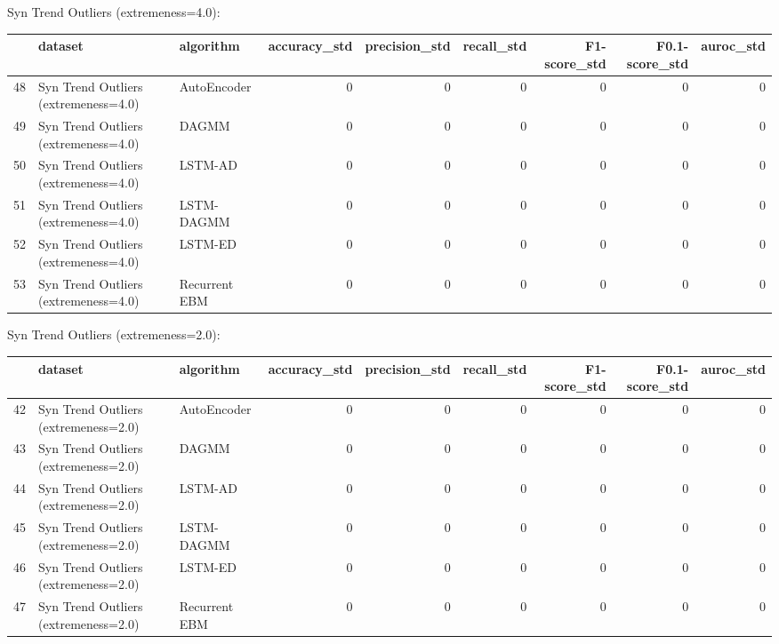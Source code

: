 Syn Trend Outliers (extremeness=4.0):

\begin{tabular}{rllrrrrrr}
\hline
    & dataset                              & algorithm     &   accuracy\_std &   precision\_std &   recall\_std &   F1-score\_std &   F0.1-score\_std &   auroc\_std \\
\hline
 48 & Syn Trend Outliers (extremeness=4.0) & AutoEncoder   &              0 &               0 &            0 &              0 &                0 &           0 \\
 49 & Syn Trend Outliers (extremeness=4.0) & DAGMM         &              0 &               0 &            0 &              0 &                0 &           0 \\
 50 & Syn Trend Outliers (extremeness=4.0) & LSTM-AD       &              0 &               0 &            0 &              0 &                0 &           0 \\
 51 & Syn Trend Outliers (extremeness=4.0) & LSTM-DAGMM    &              0 &               0 &            0 &              0 &                0 &           0 \\
 52 & Syn Trend Outliers (extremeness=4.0) & LSTM-ED       &              0 &               0 &            0 &              0 &                0 &           0 \\
 53 & Syn Trend Outliers (extremeness=4.0) & Recurrent EBM &              0 &               0 &            0 &              0 &                0 &           0 \\
\hline
\end{tabular}

Syn Trend Outliers (extremeness=2.0):

\begin{tabular}{rllrrrrrr}
\hline
    & dataset                              & algorithm     &   accuracy\_std &   precision\_std &   recall\_std &   F1-score\_std &   F0.1-score\_std &   auroc\_std \\
\hline
 42 & Syn Trend Outliers (extremeness=2.0) & AutoEncoder   &              0 &               0 &            0 &              0 &                0 &           0 \\
 43 & Syn Trend Outliers (extremeness=2.0) & DAGMM         &              0 &               0 &            0 &              0 &                0 &           0 \\
 44 & Syn Trend Outliers (extremeness=2.0) & LSTM-AD       &              0 &               0 &            0 &              0 &                0 &           0 \\
 45 & Syn Trend Outliers (extremeness=2.0) & LSTM-DAGMM    &              0 &               0 &            0 &              0 &                0 &           0 \\
 46 & Syn Trend Outliers (extremeness=2.0) & LSTM-ED       &              0 &               0 &            0 &              0 &                0 &           0 \\
 47 & Syn Trend Outliers (extremeness=2.0) & Recurrent EBM &              0 &               0 &            0 &              0 &                0 &           0 \\
\hline
\end{tabular}

